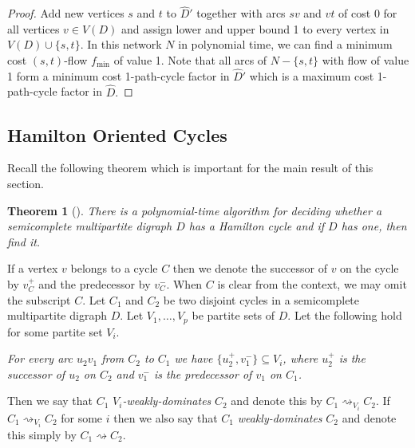\documentclass{article}
\newtheorem{theorem}{Theorem}[section]
\newcommand{\GGnn}[1]{{#1}}
\newcommand{\wdom}[1]{\rightsquigarrow}
\newcommand{\wdomV}[1]{\rightsquigarrow_{#1}}
\newcommand{\2}{\vspace{0.2cm}}
\begin{document}
\begin{proof}
Add new vertices $s$ and $t$ to $\hat{D}'$ together with arcs $sv$ and $vt$ of cost 0 for all vertices $v\in V(D)$ and assign lower and upper bound 1 to every vertex in $V(D)\cup \{s,t\}.$ In this network $N$ in polynomial time, we can find a minimum cost $(s,t)$-flow $f_{\min}$ of value 1.
Note that all arcs of $N-\{s,t\}$ with flow of value 1 form a minimum cost 1-path-cycle factor in $\hat{D}'$ which is a maximum cost 1-path-cycle factor in $\hat{D}.$
\end{proof}


\subsection{Hamilton Oriented Cycles}

Recall the following theorem which is important for the main result of this section.

\begin{theorem}[\cite{BGY98,Y99}]\label{mthc}
There is a polynomial-time algorithm for deciding whether a semicomplete multipartite digraph $D$ has a Hamilton cycle and if $D$ has one, then find it.
\end{theorem}

If a vertex $v$ belongs to a cycle $C$ then we denote the successor of $v$ on the cycle by $v_C^+$ and the predecessor by $v_C^-$. When $C$ is clear from the context,
we may omit the subscript $C$.
Let $C_1$ and $C_2$ be two disjoint cycles in a semicomplete multipartite digraph $D$. \GGnn{Let $V_1,\dots ,V_p$ be partite sets of $D$.} Let  the following hold for some partite set $V_i$.

\vspace{1mm}

{\em For every arc $u_2 v_1$ from $C_2$ to $C_1$ we have $\{u_2^+,v_1^-\} \subseteq V_i$, where $u_2^+$ is the successor of $u_2$ on $C_2$ and
$v_1^-$ is the predecessor of $v_1$ on $C_1$. }

\vspace{1mm}

\noindent Then we say that $C_1$ {\em $V_i$-weakly-dominates} $C_2$ and denote this by $C_1 \wdomV{V_i} C_2$.
If $C_1 \wdomV{V_i} C_2$ for some $i$ then we also say that
$C_1$ {\em weakly-dominates} $C_2$ and denote this simply by $C_1 \wdom{} C_2$.
\end{document}
